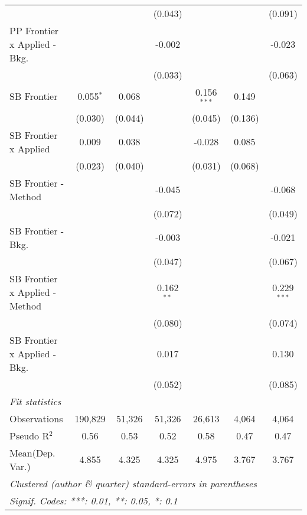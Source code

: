 \begin{tabular}{lcccccc}
                                  &              &              & (0.043)      &               &         & (0.091)\\   
   PP Frontier x Applied - Bkg.   &              &              & -0.002       &               &         & -0.023\\   
                                  &              &              & (0.033)      &               &         & (0.063)\\   
   SB Frontier                    & 0.055$^{*}$  & 0.068        &              & 0.156$^{***}$ & 0.149   &   \\   
                                  & (0.030)      & (0.044)      &              & (0.045)       & (0.136) &   \\   
   SB Frontier x Applied          & 0.009        & 0.038        &              & -0.028        & 0.085   &   \\   
                                  & (0.023)      & (0.040)      &              & (0.031)       & (0.068) &   \\   
   SB Frontier - Method           &              &              & -0.045       &               &         & -0.068\\   
                                  &              &              & (0.072)      &               &         & (0.049)\\   
   SB Frontier - Bkg.             &              &              & -0.003       &               &         & -0.021\\   
                                  &              &              & (0.047)      &               &         & (0.067)\\   
   SB Frontier x Applied - Method &              &              & 0.162$^{**}$ &               &         & 0.229$^{***}$\\   
                                  &              &              & (0.080)      &               &         & (0.074)\\   
   SB Frontier x Applied - Bkg.   &              &              & 0.017        &               &         & 0.130\\   
                                  &              &              & (0.052)      &               &         & (0.085)\\   
   \midrule
   \emph{Fit statistics}\\
   Observations                   & 190,829      & 51,326       & 51,326       & 26,613        & 4,064   & 4,064\\  
   Pseudo R$^2$                   & 0.56         & 0.53         & 0.52         & 0.58          & 0.47    & 0.47\\  
Mean(Dep. Var.) & 4.855 & 4.325 & 4.325 & 4.975 & 3.767 & 3.767 \\
   \midrule \midrule
   \multicolumn{7}{l}{\emph{Clustered (author \& quarter) standard-errors in parentheses}}\\
   \multicolumn{7}{l}{\emph{Signif. Codes: ***: 0.01, **: 0.05, *: 0.1}}\\
\end{tabular}
\par\endgroup
